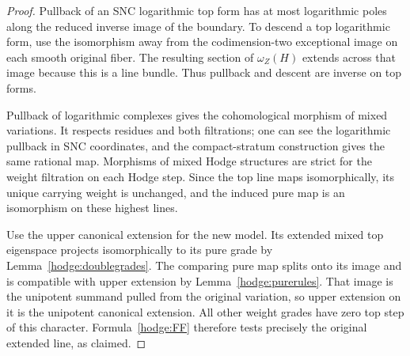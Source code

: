 \begin{proof}
Pullback of an SNC logarithmic top form has at most logarithmic
poles along the reduced inverse image of the boundary.  To descend
a top logarithmic form, use the isomorphism away from the
codimension-two exceptional image on each smooth original fiber.
The resulting section of \(\omega_Z(H)\) extends across that image
because this is a line bundle.  Thus pullback and descent are
inverse on top forms.

Pullback of logarithmic complexes gives the cohomological morphism
of mixed variations.  It respects residues and both filtrations;
one can see the logarithmic pullback in SNC coordinates, and the
compact-stratum construction gives the same rational map.
Morphisms of mixed Hodge structures are strict for the weight
filtration on each Hodge step.  Since the top line maps
isomorphically, its unique carrying weight is unchanged, and the
induced pure map is an isomorphism on these highest lines.

Use the upper canonical extension for the new model.  Its extended
mixed top eigenspace projects isomorphically to its pure grade by
Lemma~\ref{hodge:doublegrades}.  The comparing pure map splits onto
its image and is compatible with upper extension by
Lemma~\ref{hodge:purerules}.  That image is the unipotent summand
pulled from the original variation, so upper extension on it is
the unipotent canonical extension.  All other weight grades have
zero top step of this character.  Formula~\eqref{hodge:FF} therefore
tests precisely the original extended line, as claimed.
\end{proof}
